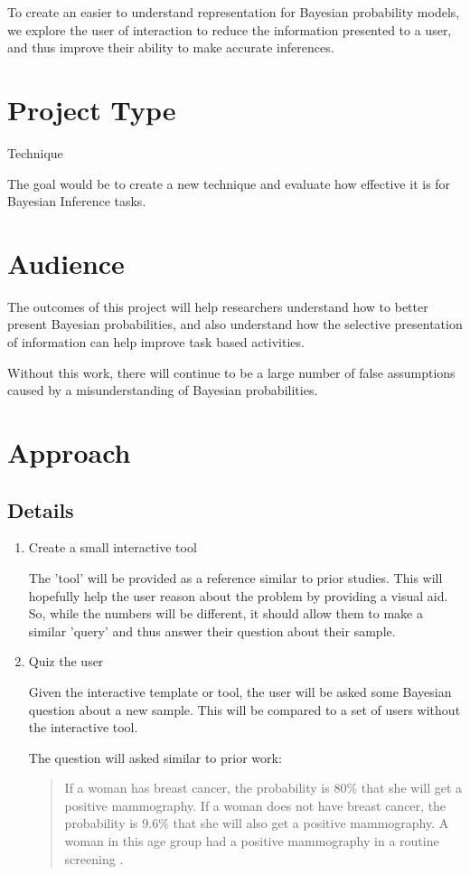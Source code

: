 \documentclass{proc}
\begin{document}
To create an easier to understand representation for Bayesian probability models, we explore the user
of interaction to reduce the information presented to a user, and thus improve their ability to make accurate
inferences. 

\section{Project Type}

Technique 

The goal would be to create a new technique and evaluate how effective it is for Bayesian Inference tasks. 

\section{Audience} 

The outcomes of this project will help researchers understand how to better present Bayesian probabilities, 
and also understand how the selective presentation of information can help improve task based activities. 

Without this work, there will continue to be a large number of false assumptions caused by a misunderstanding of 
Bayesian probabilities. 

\section{Approach}
\subsection{Details}
\begin{enumerate}
\item Create a small interactive tool

The 'tool' will be provided as a reference similar to prior studies. This will hopefully help the user reason
about the problem by providing a visual aid. So, while the numbers will be different, it should allow them to 
make a similar 'query' and thus answer their question about their sample. 

\item Quiz the user

Given the interactive template or tool, the user will be asked some Bayesian question about a new sample. 
This will be compared to a set of users without the interactive tool. 

The question will asked similar to prior work: 
\begin{quote}
    If a woman has breast cancer, the
    probability is 80\% that she will get a positive mammography. If a woman
    does not have breast cancer, the probability is 9.6\% that she will also
    get a positive mammography. A woman in this age group had a positive
    mammography in a routine screening \cite{Gigerenzer1995}.
\end{quote}
\end{enumerate}
\end{document}
